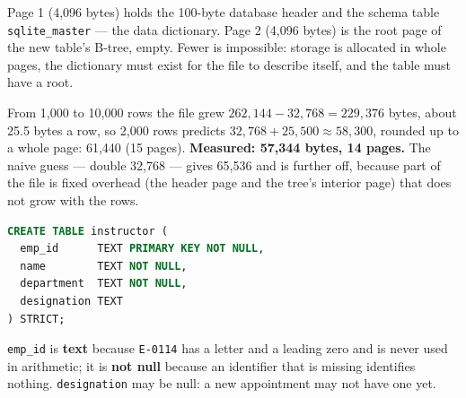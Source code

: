 \begin{ans}
  \item Page 1 (4{,}096 bytes) holds the 100-byte database header and the
        schema table \texttt{sqlite\_master} --- the data dictionary. Page 2
        (4{,}096 bytes) is the root page of the new table's B-tree, empty.
        Fewer is impossible: storage is allocated in whole pages, the
        dictionary must exist for the file to describe itself, and the table
        must have a root.
  \item From 1{,}000 to 10{,}000 rows the file grew $262{,}144 - 32{,}768 =
        229{,}376$ bytes, about 25.5 bytes a row, so 2{,}000 rows predicts
        $32{,}768 + 25{,}500 \approx 58{,}300$, rounded up to a whole page:
        61{,}440 (15 pages). \textbf{Measured: 57{,}344 bytes, 14 pages.} The
        naive guess --- double 32{,}768 --- gives 65{,}536 and is further off,
        because part of the file is fixed overhead (the header page and the
        tree's interior page) that does not grow with the rows.
  \item
\begin{lstlisting}[language=sql]
CREATE TABLE instructor (
  emp_id      TEXT PRIMARY KEY NOT NULL,
  name        TEXT NOT NULL,
  department  TEXT NOT NULL,
  designation TEXT
) STRICT;
\end{lstlisting}
        \texttt{emp\_id} is \textbf{text} because \texttt{E-0114} has
        a letter and a leading zero and is never used in arithmetic; it is
        \textbf{not null} because an identifier that is missing identifies
        nothing. \texttt{designation} may be null: a new appointment may not
        have one yet.
\end{ans}

